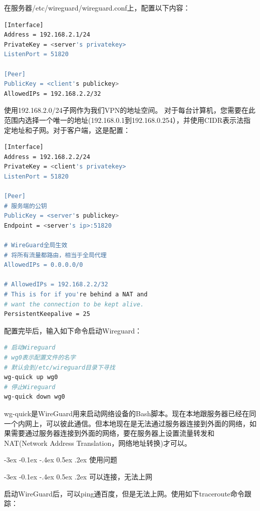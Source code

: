 \documentclass[8pt]{book}
\makeatletter
\numberwithin{dummy}{section}
\theoremstyle{ocrenumbox}
\theoremstyle{blacknumex}
\theoremstyle{blacknumbox}
\theoremstyle{ocrenum}
\renewcommand{\subsection}{\@startsection {subsection}{2}{\z@}
	{-3ex \@plus -0.1ex \@minus -.4ex}
	{0.5ex \@plus.2ex }
	{\normalfont\sffamily\bfseries}}
\makeatother
\begin{document}
在服务器/etc/wireguard/wireguard.conf上，配置以下内容：

\begin{lstlisting}[language=Bash]
[Interface]　　
Address = 192.168.2.1/24　　
PrivateKey = <server's privatekey>　　
ListenPort = 51820　　

[Peer]　　
PublicKey = <client's publickey>　　
AllowedIPs = 192.168.2.2/32
\end{lstlisting}

使用192.168.2.0/24子网作为我们VPN的地址空间。 对于每台计算机，您需要在此范围内选择一个唯一的地址(192.168.0.1到192.168.0.254），并使用CIDR表示法指定地址和子网。对于客户端，这是配置：
\begin{lstlisting}[language=Bash]
[Interface]　　
Address = 192.168.2.2/24　　
PrivateKey = <client's privatekey>　　
ListenPort = 51820
　　
[Peer]
# 服务端的公钥　　
PublicKey = <server's publickey>　　
Endpoint = <server's ip>:51820　　

# WireGuard全局生效
# 将所有流量都路由，相当于全局代理
AllowedIPs = 0.0.0.0/0

# AllowedIPs = 192.168.2.2/32　　
# This is for if you're behind a NAT and　　
# want the connection to be kept alive.　　
PersistentKeepalive = 25
\end{lstlisting}

配置完毕后，输入如下命令启动Wireguard：

\begin{lstlisting}[language=Bash]
# 启动Wireguard
# wg0表示配置文件的名字
# 默认会到/etc/wireguard目录下寻找
wg-quick up wg0
# 停止Wireguard
wg-quick down wg0
\end{lstlisting}

wg-quick是WireGuard用来启动网络设备的Bash脚本。现在本地跟服务器已经在同一个内网上，可以彼此通信。但本地现在是无法通过服务器连接到外面的网络，如果需要通过服务器连接到外面的网络，要在服务器上设置流量转发和NAT(Network Address Translation，网络地址转换)才可以。

\subsection{使用问题}

\subsection{可以连接，无法上网}

启动WireGuard后，可以ping通百度，但是无法上网。使用如下traceroute命令跟踪：
\end{document}
